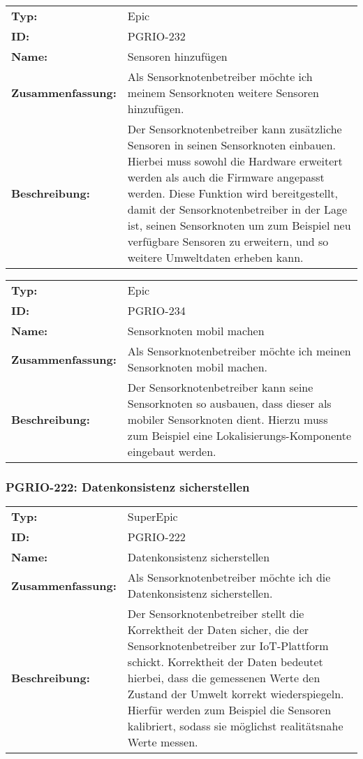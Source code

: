 		\begin{flushleft} 
\begin{tabular}{@{}lp{100mm}} 
\textbf{Typ:} & Epic \\ 
\textbf{ID:} & PGRIO-232 \\ 
\textbf{Name:} & Sensoren hinzufügen \\ 
\textbf{Zusammenfassung:} & Als Sensorknotenbetreiber möchte ich meinem Sensorknoten weitere Sensoren hinzufügen. \\ 
\textbf{Beschreibung:} & Der Sensorknotenbetreiber kann zusätzliche Sensoren in seinen Sensorknoten einbauen. Hierbei muss sowohl die Hardware erweitert werden als auch die Firmware angepasst werden. Diese Funktion wird bereitgestellt, damit der Sensorknotenbetreiber in der Lage ist, seinen Sensorknoten um zum Beispiel neu verfügbare Sensoren zu erweitern, und so weitere Umweltdaten erheben kann.  \\ 
\end{tabular} 
\end{flushleft} 

		\begin{flushleft} 
\begin{tabular}{@{}lp{100mm}} 
\textbf{Typ:} & Epic \\ 
\textbf{ID:} & PGRIO-234 \\ 
\textbf{Name:} & Sensorknoten mobil machen \\ 
\textbf{Zusammenfassung:} & Als Sensorknotenbetreiber möchte ich meinen Sensorknoten mobil machen. \\ 
\textbf{Beschreibung:} & Der Sensorknotenbetreiber kann seine Sensorknoten so ausbauen, dass dieser als mobiler Sensorknoten dient. Hierzu muss zum Beispiel eine Lokalisierungs-Komponente eingebaut werden. \\ 
\end{tabular} 
\end{flushleft} 

	\subsubsection{PGRIO-222: Datenkonsistenz sicherstellen} 
\begin{flushleft} 
\begin{tabular}{@{}lp{100mm}} 
\textbf{Typ:} & SuperEpic \\ 
\textbf{ID:} & PGRIO-222 \\ 
\textbf{Name:} & Datenkonsistenz sicherstellen \\ 
\textbf{Zusammenfassung:} & Als Sensorknotenbetreiber möchte ich die Datenkonsistenz sicherstellen. \\ 
\textbf{Beschreibung:} & Der Sensorknotenbetreiber stellt die Korrektheit der Daten sicher, die der Sensorknotenbetreiber zur IoT-Plattform schickt. Korrektheit der Daten bedeutet hierbei, dass die gemessenen Werte den Zustand der Umwelt korrekt wiederspiegeln. Hierfür werden zum Beispiel die Sensoren kalibriert, sodass sie möglichst realitätsnahe Werte messen. \\ 
\end{tabular} 
\end{flushleft} 

